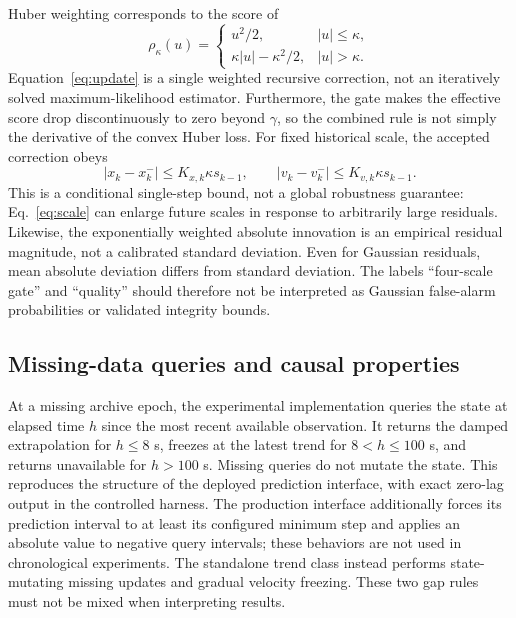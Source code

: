\documentclass[12pt,a4paper]{article}
\begin{document}
Huber weighting corresponds to the score of
\begin{equation}
 \rho_\kappa(u)=\begin{cases}u^2/2,&|u|\le\kappa,\\
 \kappa|u|-\kappa^2/2,&|u|>\kappa.
 \end{cases}
 \label{eq:huberloss}
\end{equation}
Equation~\eqref{eq:update} is a single weighted recursive correction, not an iteratively solved maximum-likelihood estimator. Furthermore, the gate makes the effective score drop discontinuously to zero beyond $\gamma$, so the combined rule is not simply the derivative of the convex Huber loss. For fixed historical scale, the accepted correction obeys
\begin{equation}
 |x_k-x_k^-|\le K_{x,k}\kappa s_{k-1},\qquad
 |v_k-v_k^-|\le K_{v,k}\kappa s_{k-1}.
 \label{eq:bound}
\end{equation}
This is a conditional single-step bound, not a global robustness guarantee: Eq.~\eqref{eq:scale} can enlarge future scales in response to arbitrarily large residuals. Likewise, the exponentially weighted absolute innovation is an empirical residual magnitude, not a calibrated standard deviation. Even for Gaussian residuals, mean absolute deviation differs from standard deviation. The labels ``four-scale gate'' and ``quality'' should therefore not be interpreted as Gaussian false-alarm probabilities or validated integrity bounds.

\subsection{Missing-data queries and causal properties}
At a missing archive epoch, the experimental implementation queries the state at elapsed time $h$ since the most recent available observation. It returns the damped extrapolation for $h\le8$ s, freezes at the latest trend for $8<h\le100$ s, and returns unavailable for $h>100$ s. Missing queries do not mutate the state. This reproduces the structure of the deployed prediction interface, with exact zero-lag output in the controlled harness. The production interface additionally forces its prediction interval to at least its configured minimum step and applies an absolute value to negative query intervals; these behaviors are not used in chronological experiments. The standalone trend class instead performs state-mutating missing updates and gradual velocity freezing. These two gap rules must not be mixed when interpreting results.
\end{document}
